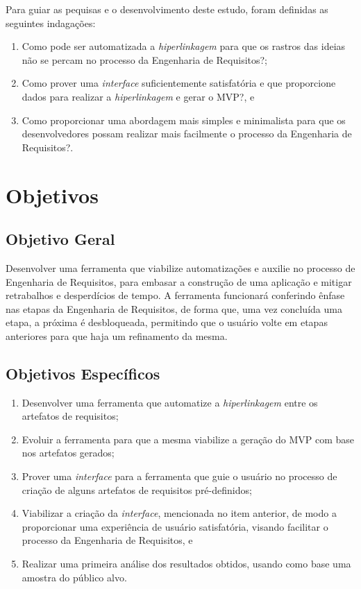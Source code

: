 \label{ref:questao_pesquisa}

Para guiar as pequisas e o desenvolvimento deste estudo, foram definidas as seguintes indagações:

\begin{enumerate}
    \item Como pode ser automatizada a \textit{hiperlinkagem} para que os rastros das ideias não se percam no processo da Engenharia de Requisitos?;
    \item Como prover uma \textit{interface} suficientemente satisfatória e que proporcione dados para realizar a \textit{hiperlinkagem} e gerar o MVP?, e
    \item Como proporcionar uma abordagem mais simples e minimalista para que os desenvolvedores possam realizar mais facilmente o processo da Engenharia de Requisitos?.
\end{enumerate}

\section{Objetivos}

\label{ref:objetivos}

\subsection{Objetivo Geral}

Desenvolver uma ferramenta que viabilize automatizações e auxilie no processo de Engenharia de Requisitos, para embasar a construção de uma aplicação e mitigar retrabalhos e desperdícios de tempo. A ferramenta funcionará conferindo ênfase nas etapas da Engenharia de Requisitos, de forma que, uma vez concluída uma etapa, a próxima é desbloqueada, permitindo que o usuário volte em etapas anteriores para que haja um refinamento da mesma.

\subsection{Objetivos Específicos}

\begin{enumerate}
    \item \label{oe_hiperlinkagem} Desenvolver uma ferramenta que automatize a \textit{hiperlinkagem} entre os artefatos de requisitos;
    \item \label{oe_mvp} Evoluir a ferramenta para que a mesma viabilize a geração do MVP com base nos artefatos gerados;
    \item \label{oe_guiar_usuario} Prover uma \textit{interface} para a ferramenta que guie o usuário no processo de criação de alguns artefatos de requisitos pré-definidos;
    \item \label{oe_ux_facilitada} Viabilizar a criação da \textit{interface}, mencionada no item anterior, de modo a proporcionar uma experiência de usuário satisfatória, visando facilitar o processo da Engenharia de Requisitos, e
    \item \label{oe_resultados} Realizar uma primeira análise dos resultados obtidos, usando como base uma amostra do público alvo.
\end{enumerate}

